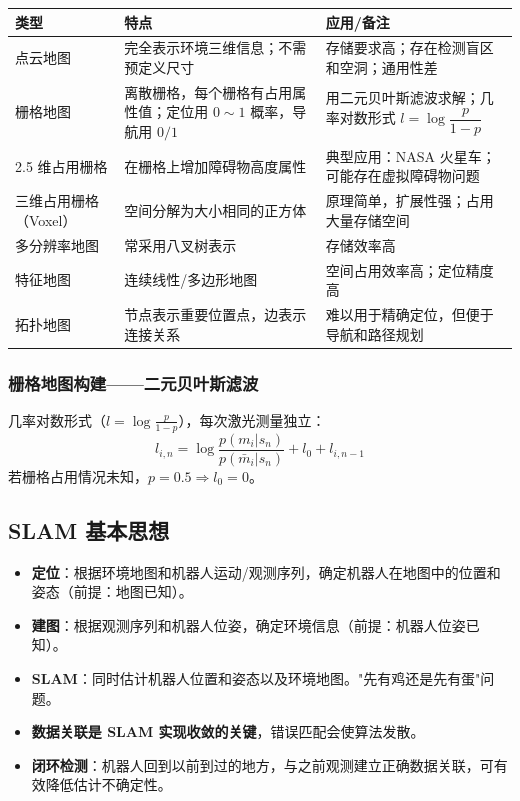 \documentclass[11pt,a4paper]{article}
\begin{document}
\begin{center}
\begin{tabular}{p{2.5cm}|p{5cm}|p{5.5cm}}
\toprule
类型 & 特点 & 应用/备注 \\
\midrule
点云地图 & 完全表示环境三维信息；不需预定义尺寸 & 存储要求高；存在检测盲区和空洞；通用性差 \\
栅格地图 & 离散栅格，每个栅格有占用属性值；定位用 $0\sim1$ 概率，导航用 $0/1$ & 用二元贝叶斯滤波求解；几率对数形式 $l=\log\dfrac{p}{1-p}$ \\
2.5 维占用栅格 & 在栅格上增加障碍物高度属性 & 典型应用：NASA 火星车；可能存在虚拟障碍物问题 \\
三维占用栅格（Voxel） & 空间分解为大小相同的正方体 & 原理简单，扩展性强；占用大量存储空间 \\
多分辨率地图 & 常采用八叉树表示 & 存储效率高 \\
特征地图 & 连续线性/多边形地图 & 空间占用效率高；定位精度高 \\
拓扑地图 & 节点表示重要位置点，边表示连接关系 & 难以用于精确定位，但便于导航和路径规划 \\
\bottomrule
\end{tabular}
\end{center}

\subsubsection*{栅格地图构建——二元贝叶斯滤波}
几率对数形式（$l=\log\frac{p}{1-p}$），每次激光测量独立：
\[
l_{i,n}=\log\frac{p(m_i|s_n)}{p(\bar{m}_i|s_n)}+l_0+l_{i,n-1}
\]
若栅格占用情况未知，$p=0.5\Rightarrow l_0=0$。

\subsection{SLAM 基本思想}

\begin{itemize}
  \item \textbf{定位}：根据环境地图和机器人运动/观测序列，确定机器人在地图中的位置和姿态（前提：地图已知）。
  \item \textbf{建图}：根据观测序列和机器人位姿，确定环境信息（前提：机器人位姿已知）。
  \item \textbf{SLAM}：同时估计机器人位置和姿态以及环境地图。"先有鸡还是先有蛋"问题。
  \item \textbf{数据关联是 SLAM 实现收敛的关键}，错误匹配会使算法发散。
  \item \textbf{闭环检测}：机器人回到以前到过的地方，与之前观测建立正确数据关联，可有效降低估计不确定性。
\end{itemize}
\end{document}
